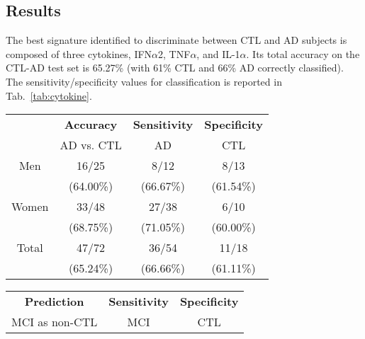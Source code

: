 \documentclass{standalone}
\begin{document}
\subsection[Results]{Results}\label{cytokine:cytokine_result}

The best signature identified to discriminate between CTL and AD subjects is composed of three cytokines, IFN$\alpha$2, TNF$\alpha$, and IL-1$\alpha$.
Its total accuracy on the CTL-AD test set is 65.27\% (with 61\% CTL and 66\% AD correctly classified).
The sensitivity/specificity values for classification is reported in Tab.~\ref{tab:cytokine}.

\begin{table}[!htb]
  \begin{minipage}{.5\linewidth}
    \hspace{-1.5cm}
      \begin{tabular}{cccc}
          \hline \rowcolor{darkgrayrow}
                      &  \textbf{Accuracy}  &  \textbf{Sensitivity}  &  \textbf{Specificity} \\
                      &  AD vs. CTL         &  AD                    &    CTL                \\
          \hline
              Men     &    16/25            &    8/12                &    8/13               \\
                      &          (64.00\%)  &         (66.67\%)      &         (61.54\%)     \\
              Women   &    33/48            &   27/38                &    6/10               \\
                      &          (68.75\%)  &         (71.05\%)      &         (60.00\%)     \\
              Total   &    47/72            &   36/54                &   11/18               \\
                      &          (65.24\%)  &         (66.66\%)      &         (61.11\%)     \\
          \hline
      \end{tabular}
  \end{minipage}%
  \begin{minipage}{.5\linewidth}
    \hspace{.5cm}
      \begin{tabular}{ccc}
          \hline \rowcolor{darkgrayrow}
                        \textbf{Prediction} &  \textbf{Sensitivity}  &  \textbf{Specificity} \\
                         MCI as non-CTL     &  MCI                   &    CTL                \\

\end{tabular}
\end{minipage}
\end{table}
\end{document}
